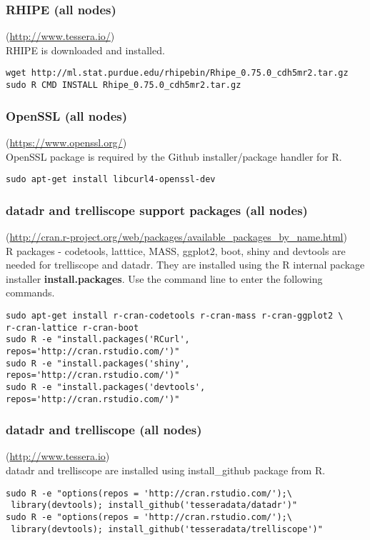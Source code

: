 \subsubsection{RHIPE (all nodes)}(\url{http://www.tessera.io/})\\
RHIPE is downloaded and installed.
\begin{verbatim}
wget http://ml.stat.purdue.edu/rhipebin/Rhipe_0.75.0_cdh5mr2.tar.gz
sudo R CMD INSTALL Rhipe_0.75.0_cdh5mr2.tar.gz
\end{verbatim}

\subsubsection{OpenSSL (all nodes)}(\url{https://www.openssl.org/})\\
OpenSSL package is required by the Github installer/package handler for R. 
\begin{verbatim}
sudo apt-get install libcurl4-openssl-dev
\end{verbatim}

\subsubsection{datadr and trelliscope support packages (all nodes)}(\url{http://cran.r-project.org/web/packages/available\_packages\_by\_name.html})\\
R packages - codetools, latttice, MASS, ggplot2, boot, shiny and devtools are needed for trelliscope and datadr. They are installed using the R internal package installer \textbf{install.packages}. Use the command line to enter the following commands. 
\begin{verbatim}
sudo apt-get install r-cran-codetools r-cran-mass r-cran-ggplot2 \
r-cran-lattice r-cran-boot
sudo R -e "install.packages('RCurl', repos='http://cran.rstudio.com/')"
sudo R -e "install.packages('shiny', repos='http://cran.rstudio.com/')"
sudo R -e "install.packages('devtools', repos='http://cran.rstudio.com/')"
\end{verbatim}

\subsubsection{datadr and trelliscope (all nodes)}(\url{http://www.tessera.io})\\
datadr and trelliscope are installed using install\_github package from R. 
\begin{verbatim}
sudo R -e "options(repos = 'http://cran.rstudio.com/');\
 library(devtools); install_github('tesseradata/datadr')"
sudo R -e "options(repos = 'http://cran.rstudio.com/');\
 library(devtools); install_github('tesseradata/trelliscope')"
\end{verbatim}

